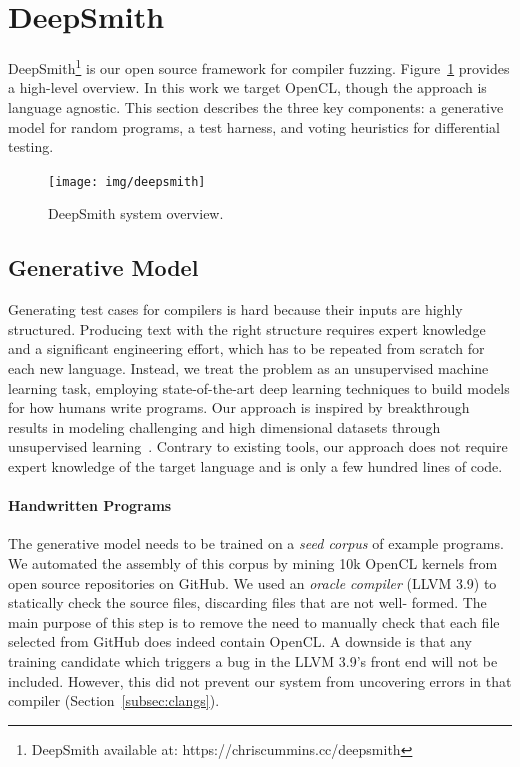 \section{DeepSmith}

DeepSmith\footnote{DeepSmith available at: https://chriscummins.cc/deepsmith} is
our open source framework for compiler fuzzing. Figure~\ref{fig:deeptune}
provides a high-level overview. In this work we target OpenCL, though the
approach is language agnostic. This section describes the three key components:
a generative model for random programs, a test harness, and voting heuristics
for differential testing.

\begin{figure}
  \centering
  \texttt{[image: img/deepsmith]}
  \vspace{-1em}
  \caption{%
  DeepSmith system overview.
  \vspace{-1em}
  }%
  \label{fig:deeptune}
\end{figure}

\subsection{Generative Model}

Generating test cases for compilers is hard because their inputs are highly
structured. Producing text with the right structure requires expert knowledge
and a significant engineering effort, which has to be repeated from scratch for
each new language. Instead, we treat the problem as an unsupervised machine
learning task, employing state-of-the-art deep learning techniques to build
models for how humans write programs. Our approach is inspired by breakthrough
results in modeling challenging and high dimensional datasets through
unsupervised learning~\cite{Raghu2016,Radford2016b,Bowman2015}. Contrary to
existing tools, our approach does not require expert knowledge of the target
language and is only a few hundred lines of code.

\paragraph{Handwritten Programs}

The generative model needs to be trained on a \emph{seed corpus} of example
programs. We automated the assembly of this corpus by mining 10k OpenCL kernels
from open source repositories on GitHub. We used an \emph{oracle compiler} (LLVM
3.9) to statically check the source files, discarding files that are not well-
formed. The main purpose of this step is to remove the need to manually check
that each file selected from GitHub does indeed contain OpenCL. A downside is
that any training candidate which triggers a bug in the LLVM 3.9's front end
will not be included. However, this did not prevent our system from uncovering
errors in that compiler (Section~\ref{subsec:clangs}).

